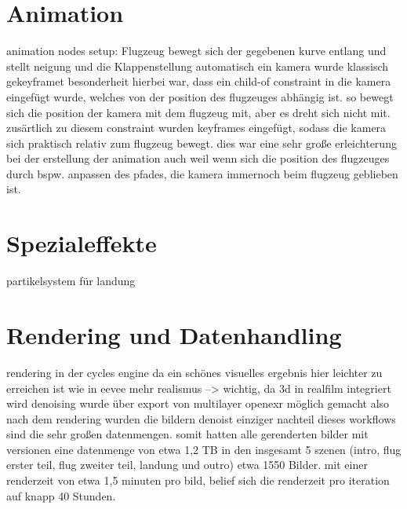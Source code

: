 \section{Animation}

animation nodes setup: Flugzeug bewegt sich der gegebenen kurve entlang und stellt neigung und die Klappenstellung automatisch ein
kamera wurde klassisch gekeyframet
besonderheit hierbei war, dass ein child-of constraint in die kamera eingefügt wurde, welches von der position des flugzeuges abhängig ist.
so bewegt sich die position der kamera mit dem flugzeug mit, aber es dreht sich nicht mit. zusärtlich zu diesem constraint wurden keyframes eingefügt, sodass die kamera sich praktisch relativ zum flugzeug bewegt.
dies war eine sehr große erleichterung bei der erstellung der animation
auch weil wenn sich die position des flugzeuges durch bspw. anpassen des pfades, die kamera immernoch beim flugzeug geblieben ist.

\section{Spezialeffekte}

partikelsystem für landung

\section{Rendering und Datenhandling}

rendering in der cycles engine
da ein schönes visuelles ergebnis hier leichter zu erreichen ist wie in eevee
mehr realismus --> wichtig, da 3d in realfilm integriert wird
denoising wurde über export von multilayer openexr möglich gemacht
also nach dem rendering wurden die bildern denoist
einziger nachteil dieses workflows sind die sehr großen datenmengen. somit hatten alle gerenderten bilder mit versionen eine datenmenge von etwa 1,2 TB
in den insgesamt 5 szenen (intro, flug erster teil, flug zweiter teil, landung und outro) etwa 1550 Bilder.
mit einer renderzeit von etwa 1,5 minuten pro bild, belief sich die renderzeit pro iteration auf knapp 40 Stunden.

